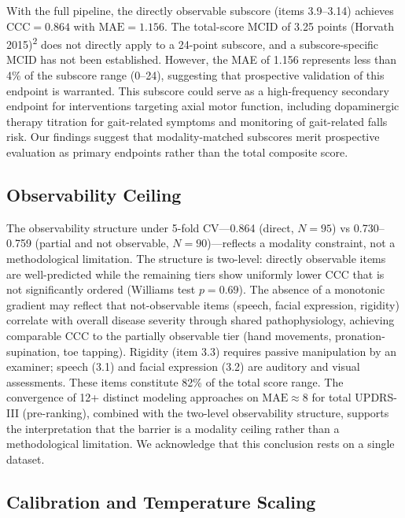 \documentclass[11pt,a4paper]{article}
\begin{document}
With the full pipeline, the directly observable subscore (items 3.9--3.14) achieves $\mathrm{CCC}=0.864$ with $\mathrm{MAE}=1.156$. The total-score MCID of 3.25 points (Horvath 2015)\textsuperscript{2} does not directly apply to a 24-point subscore, and a subscore-specific MCID has not been established. However, the MAE of 1.156 represents less than 4\% of the subscore range (0--24), suggesting that prospective validation of this endpoint is warranted. This subscore could serve as a high-frequency secondary endpoint for interventions targeting axial motor function, including dopaminergic therapy titration for gait-related symptoms and monitoring of gait-related falls risk. Our findings suggest that modality-matched subscores merit prospective evaluation as primary endpoints rather than the total composite score.

\subsection{Observability Ceiling}

The observability structure under 5-fold CV---0.864 (direct, $N=95$) vs 0.730--0.759 (partial and not observable, $N=90$)---reflects a modality constraint, not a methodological limitation. The structure is two-level: directly observable items are well-predicted while the remaining tiers show uniformly lower CCC that is not significantly ordered (Williams test $p=0.69$). The absence of a monotonic gradient may reflect that not-observable items (speech, facial expression, rigidity) correlate with overall disease severity through shared pathophysiology, achieving comparable CCC to the partially observable tier (hand movements, pronation-supination, toe tapping). Rigidity (item 3.3) requires passive manipulation by an examiner; speech (3.1) and facial expression (3.2) are auditory and visual assessments. These items constitute 82\% of the total score range. The convergence of 12+ distinct modeling approaches on $\mathrm{MAE}\approx 8$ for total UPDRS-III (pre-ranking), combined with the two-level observability structure, supports the interpretation that the barrier is a modality ceiling rather than a methodological limitation. We acknowledge that this conclusion rests on a single dataset.

\subsection{Calibration and Temperature Scaling}
\end{document}

